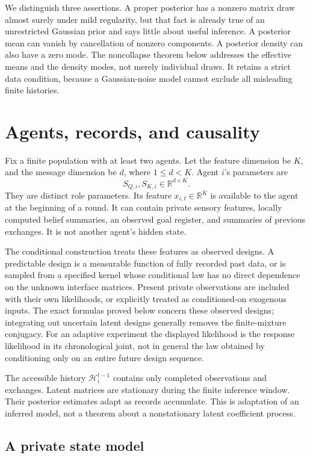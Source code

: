 \documentclass[11pt]{article}
\theoremstyle{definition}
\theoremstyle{remark}
\newcommand{\R}{\mathbb R}
\newcommand{\calH}{\mathcal H}
\begin{document}
We distinguish three assertions. A proper posterior has a nonzero matrix draw almost surely under mild regularity, but that fact is already true of an unrestricted Gaussian prior and says little about useful inference. A posterior mean can vanish by cancellation of nonzero components. A posterior density can also have a zero mode. The noncollapse theorem below addresses the effective means and the density modes, not merely individual draws. It retains a strict data condition, because a Gaussian-noise model cannot exclude all misleading finite histories.

\section{Agents, records, and causality}

Fix a finite population with at least two agents. Let the feature dimension be \(K\), and the message dimension be \(d\), where \(1\le d<K\). Agent \(i\)'s parameters are
\[
S_{Q,i},S_{K,i}\in\R^{d\times K}.
\]
They are distinct role parameters. Its feature \(x_{i,t}\in\R^K\) is available to the agent at the beginning of a round. It can contain private sensory features, locally computed belief summaries, an observed goal register, and summaries of previous exchanges. It is not another agent's hidden state.

The conditional construction treats these features as observed designs. A predictable design is a measurable function of fully recorded past data, or is sampled from a specified kernel whose conditional law has no direct dependence on the unknown interface matrices. Present private observations are included with their own likelihoods, or explicitly treated as conditioned-on exogenous inputs. The exact formulas proved below concern these observed designs; integrating out uncertain latent designs generally removes the finite-mixture conjugacy. For an adaptive experiment the displayed likelihood is the response likelihood in its chronological joint, not in general the law obtained by conditioning only on an entire future design sequence.

The accessible history \(\calH_i^{t-1}\) contains only completed observations and exchanges. Latent matrices are stationary during the finite inference window. Their posterior estimates adapt as records accumulate. This is adaptation of an inferred model, not a theorem about a nonstationary latent coefficient process.

\subsection{A private state model}
\end{document}
